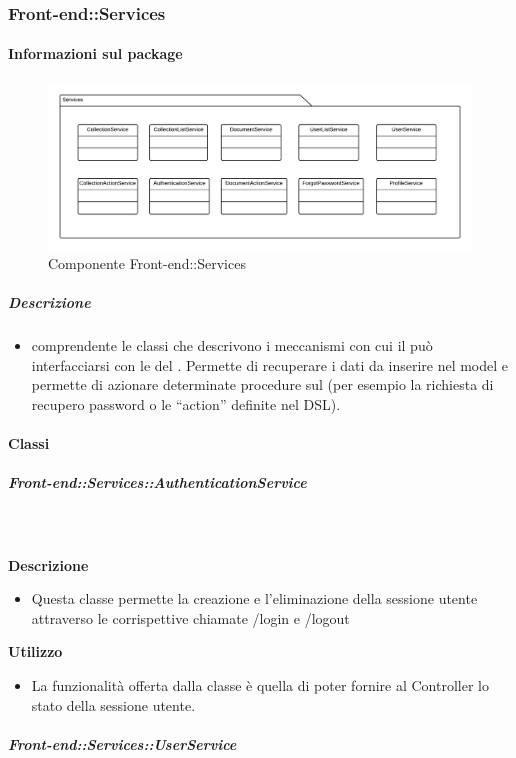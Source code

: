   \subsubsection{Front-end::Services}
  \paragraph{Informazioni sul package}
    \begin{figure}[H] 
      \begin{center} 
        \includegraphics[width=\textwidth]{packages/Front-end::Services.png}  
        \caption{Componente Front-end::Services}
      \end{center}  
    \end{figure} 
  \subparagraph{Descrizione} 
    \begin{itemize}
    \item[]  comprendente le classi che descrivono i meccanismi con cui il  può interfacciarsi con le  del . Permette di recuperare i dati da inserire nel model e permette di azionare determinate procedure sul  (per esempio la richiesta di recupero password o le ``action'' definite nel DSL).
    \end{itemize} 
    \paragraph{Classi}
      \subparagraph{Front-end::Services::AuthenticationService}
        
        \textbf{\\ \\ Descrizione} 
          \begin{itemize}
            \item[] Questa classe permette la creazione e l'eliminazione della sessione utente attraverso le corrispettive chiamate /login e /logout
          \end{itemize}      
        \textbf{Utilizzo}  
          \begin{itemize}
            \item[] La funzionalità offerta dalla classe è quella di poter fornire al Controller lo stato della sessione utente.
          \end{itemize}
      \subparagraph{Front-end::Services::UserService}
        
